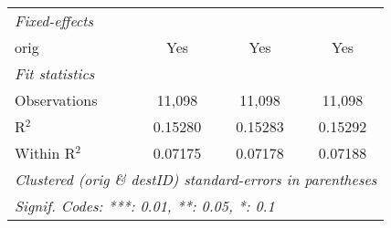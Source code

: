 \begin{tabular}{lccc}
\midrule \emph{Fixed-effects}&   &   &  \\
orig & Yes & Yes & Yes\\
\midrule \emph{Fit statistics}&  & & \\
Observations & 11,098&11,098&11,098\\
R$^2$ & 0.15280&0.15283&0.15292\\
Within R$^2$ & 0.07175&0.07178&0.07188\\
\midrule\midrule\multicolumn{4}{l}{\emph{Clustered (orig \& destID) standard-errors in parentheses}}\\
\multicolumn{4}{l}{\emph{Signif. Codes: ***: 0.01, **: 0.05, *: 0.1}}\\
\end{tabular}


